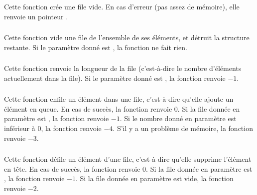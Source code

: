 \subsubsection*{}

\noindent Cette fonction crée une file vide.
En cas d'erreur (pas assez de mémoire), elle renvoie un pointeur .


\subsubsection*{}

\noindent Cette fonction vide une file de l'ensemble de ses éléments, et détruit la structure restante.
Si le paramètre donné est , la fonction ne fait rien.


\subsubsection*{}

\noindent Cette fonction renvoie la longueur de la file (c'est-à-dire le nombre d'éléments actuellement dans la file).
Si le paramètre donné est , la fonction renvoie $ -1 $.


\subsubsection*{}

\noindent Cette fonction enfile un élément dans une file, c'est-à-dire qu'elle ajoute un élément en queue.
En cas de succès, la fonction renvoie $ 0 $.
Si la file donnée en paramètre est , la fonction renvoie $ -1 $.
Si le nombre donné en paramètre est inférieur à $ 0 $, la fonction renvoie $ -4 $.
S'il y a un problème de mémoire, la fonction renvoie $ -3 $.


\subsubsection*{}

\noindent Cette fonction défile un élément d'une file, c'est-à-dire qu'elle supprime l'élément en tête.
En cas de succès, la fonction renvoie $ 0 $.
Si la file donnée en paramètre est , la fonction renvoie $ -1 $.
Si la file donnée en paramètre est vide, la fonction renvoie $ -2 $.


